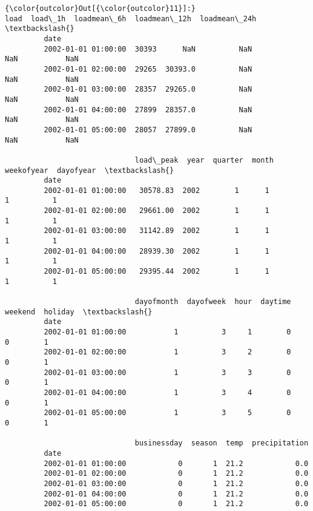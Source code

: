 \documentclass[11pt]{article}
\begin{document}
\begin{Verbatim}[commandchars=\\\{\}]
{\color{outcolor}Out[{\color{outcolor}11}]:}                       load  load\_1h  loadmean\_6h  loadmean\_12h  loadmean\_24h  \textbackslash{}
         date                                                                           
         2002-01-01 01:00:00  30393      NaN          NaN           NaN           NaN   
         2002-01-01 02:00:00  29265  30393.0          NaN           NaN           NaN   
         2002-01-01 03:00:00  28357  29265.0          NaN           NaN           NaN   
         2002-01-01 04:00:00  27899  28357.0          NaN           NaN           NaN   
         2002-01-01 05:00:00  28057  27899.0          NaN           NaN           NaN   
         
                              load\_peak  year  quarter  month  weekofyear  dayofyear  \textbackslash{}
         date                                                                          
         2002-01-01 01:00:00   30578.83  2002        1      1           1          1   
         2002-01-01 02:00:00   29661.00  2002        1      1           1          1   
         2002-01-01 03:00:00   31142.89  2002        1      1           1          1   
         2002-01-01 04:00:00   28939.30  2002        1      1           1          1   
         2002-01-01 05:00:00   29395.44  2002        1      1           1          1   
         
                              dayofmonth  dayofweek  hour  daytime  weekend  holiday  \textbackslash{}
         date                                                                          
         2002-01-01 01:00:00           1          3     1        0        0        1   
         2002-01-01 02:00:00           1          3     2        0        0        1   
         2002-01-01 03:00:00           1          3     3        0        0        1   
         2002-01-01 04:00:00           1          3     4        0        0        1   
         2002-01-01 05:00:00           1          3     5        0        0        1   
         
                              businessday  season  temp  precipitation  
         date                                                           
         2002-01-01 01:00:00            0       1  21.2            0.0  
         2002-01-01 02:00:00            0       1  21.2            0.0  
         2002-01-01 03:00:00            0       1  21.2            0.0  
         2002-01-01 04:00:00            0       1  21.2            0.0  
         2002-01-01 05:00:00            0       1  21.2            0.0  
\end{Verbatim}
            
\end{document}
